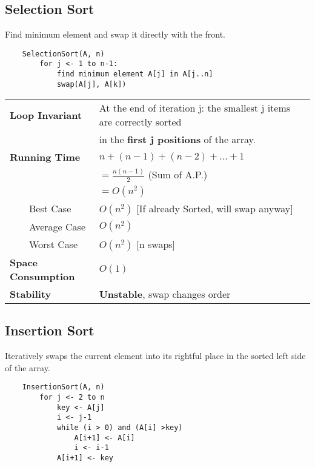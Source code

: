 \documentclass{article}
\newcommand{\tabitem}{~~\llap{\textbullet}~~}
\begin{document}
    \bigskip

    \subsection{Selection Sort}

    Find minimum element and swap it directly with the front.

    \begin{verbatim}
    SelectionSort(A, n)
        for j <- 1 to n-1:
            find minimum element A[j] in A[j..n]
            swap(A[j], A[k])
    \end{verbatim}
    
    \begin{tabular}{ll}
        \toprule
        \textbf{Loop Invariant} & At the end of iteration j: the smallest j items are correctly sorted \\
        & in the \textbf{first j positions} of the array.\\
        \midrule
        \textbf{Running Time} & $n + (n-1) + (n-2) + ... + 1$\\
        & $ = \frac{n(n-1)}{2}$ (Sum of A.P.)\\
        & $ = O(n^{2})$\\
        \tabitem Best Case & $O(n^{2})$ [If already Sorted, will swap anyway]\\
        \tabitem Average Case & $O(n^{2})$\\
        \tabitem Worst Case & $O(n^{2})$ [n swaps]\\
        \midrule
        \textbf{Space Consumption} & $O(1)$\\
        \midrule
        \textbf{Stability} & \textbf{Unstable}, swap changes order\\
        \bottomrule
    \end{tabular}

    \pagebreak

    \subsection{Insertion Sort}

    Iteratively swaps the current element into its rightful place in the sorted left side of the array.

    \begin{verbatim}
    InsertionSort(A, n)
        for j <- 2 to n
            key <- A[j]
            i <- j-1
            while (i > 0) and (A[i] >key)
                A[i+1] <- A[i]
                i <- i-1
            A[i+1] <- key
    \end{verbatim}
    
\end{document}
